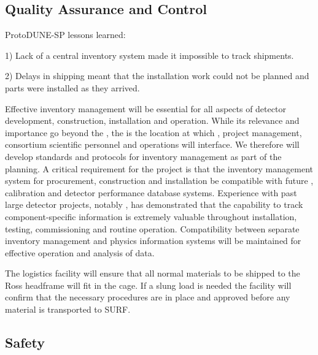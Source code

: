 \subsection{Quality Assurance and Control}
\label{sec:fdsp-tc-itf-qaqc}

ProtoDUNE-SP lessons learned:

1) Lack of a central inventory system made it impossible to track shipments.

2) Delays in shipping meant that the installation work could not be planned and parts were installed as they arrived. 

Effective inventory management will be essential for all aspects of  detector development, construction, installation and operation.  While its relevance and importance go beyond the , the  is the location at which ,  project management, consortium scientific personnel and \surf operations will interface.  We therefore will develop standards and protocols for inventory management as part of the  planning.  A critical requirement for the project is that the inventory management system for procurement, construction and installation be compatible with future , calibration and detector performance database systems.  Experience with past large detector projects, notably \nova, has demonstrated that the capability to track component-specific information is extremely valuable throughout installation, testing, commissioning and routine operation. Compatibility between separate inventory management and physics information systems will be maintained for effective operation and analysis of  data.

The logistics facility will ensure that all normal materials to be shipped to the Ross headframe will fit in the cage. If a slung load is needed the facility will confirm that the necessary procedures are in place and approved before any material is transported to SURF.

\subsection{Safety}
\label{sec:fdsp-tc-itf-safety}

